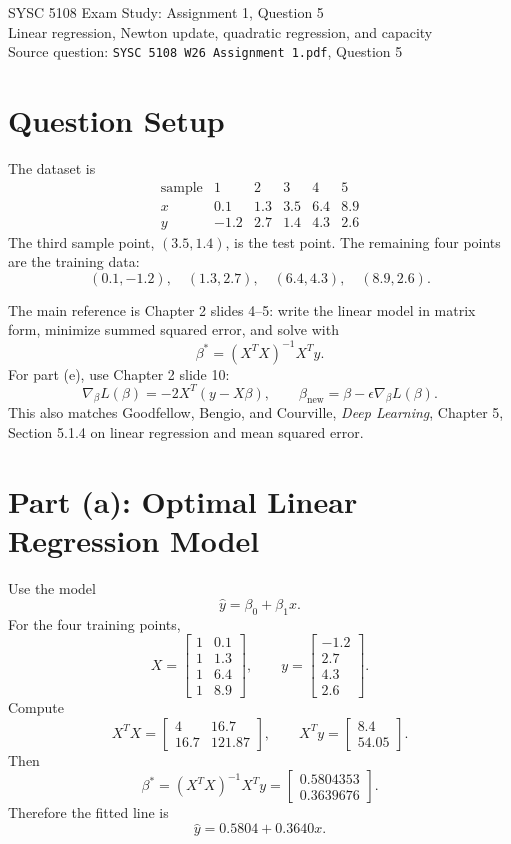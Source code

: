 \documentclass[11pt]{article}
\begin{document}
\begin{center}
{\Large SYSC 5108 Exam Study: Assignment 1, Question 5}\\
\vspace{0.3em}
{\large Linear regression, Newton update, quadratic regression, and capacity}\\
\vspace{0.3em}
Source question: \texttt{SYSC 5108 W26 Assignment 1.pdf}, Question 5
\end{center}

\section*{Question Setup}

The dataset is
\[
\begin{array}{c|ccccc}
\text{sample} & 1 & 2 & 3 & 4 & 5\\
\hline
x & 0.1 & 1.3 & 3.5 & 6.4 & 8.9\\
y & -1.2 & 2.7 & 1.4 & 4.3 & 2.6
\end{array}
\]
The third sample point, $(3.5, 1.4)$, is the test point. The remaining four points are the training data:
\[
(0.1,-1.2),\quad (1.3,2.7),\quad (6.4,4.3),\quad (8.9,2.6).
\]

The main reference is Chapter 2 slides 4--5: write the linear model in matrix form, minimize summed squared error, and solve with
\[
\beta^*=(X^T X)^{-1}X^T y.
\]
For part (e), use Chapter 2 slide 10:
\[
\nabla_\beta L(\beta)=-2X^T(y-X\beta), \qquad
\beta_{\text{new}}=\beta-\epsilon \nabla_\beta L(\beta).
\]
This also matches Goodfellow, Bengio, and Courville, \textit{Deep Learning}, Chapter 5, Section 5.1.4 on linear regression and mean squared error.

\section*{Part (a): Optimal Linear Regression Model}

Use the model
\[
\hat y=\beta_0+\beta_1x.
\]
For the four training points,
\[
X=
\begin{bmatrix}
1 & 0.1\\
1 & 1.3\\
1 & 6.4\\
1 & 8.9
\end{bmatrix},
\qquad
y=
\begin{bmatrix}
-1.2\\
2.7\\
4.3\\
2.6
\end{bmatrix}.
\]
Compute
\[
X^T X=
\begin{bmatrix}
4 & 16.7\\
16.7 & 121.87
\end{bmatrix},
\qquad
X^T y=
\begin{bmatrix}
8.4\\
54.05
\end{bmatrix}.
\]
Then
\[
\beta^*=(X^T X)^{-1}X^T y
=
\begin{bmatrix}
0.5804353\\
0.3639676
\end{bmatrix}.
\]
Therefore the fitted line is
\[
\boxed{\hat y=0.5804+0.3640x.}
\]
\end{document}
